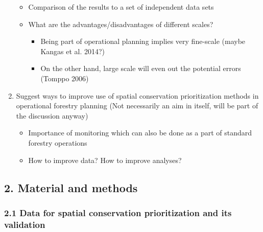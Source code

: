 \documentclass[]{article}
\begin{document}
\begin{enumerate}
  \begin{itemize}
  \itemsep1pt\parskip0pt
  \item
    Comparison of the results to a set of independent data sets
  \item
    What are the advantages/disadvantages of different scales?

    \begin{itemize}
    \itemsep1pt\parskip0pt
    \item
      Being part of operational planning implies very fine-scale (maybe
      Kangas et al. 2014?)
    \item
      On the other hand, large scale will even out the potential errors
      (Tomppo 2006)
    \end{itemize}
  \end{itemize}
\item
  Suggest ways to improve use of spatial conservation prioritization
  methods in operational forestry planning (Not necessarily an aim in
  itself, will be part of the discussion anyway)

  \begin{itemize}
  \itemsep1pt\parskip0pt
  \item
    Importance of monitoring which can also be done as a part of
    standard forestry operations
  \item
    How to improve data? How to improve analyses?
  \end{itemize}
\end{enumerate}

\subsection{2. Material and methods}

\subsubsection{2.1 Data for spatial conservation prioritization and its
validation}
\end{document}
